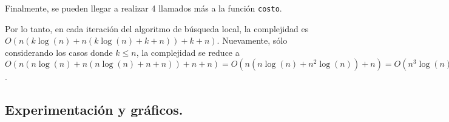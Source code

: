 Finalmente, se pueden llegar a realizar 4 llamados más a la función
\texttt{costo}.

Por lo tanto, en cada iteración del algoritmo de búsqueda local, la complejidad
es $O(n (k\log(n) + n (k\log(n) + k + n)) + k + n)$. Nuevamente, sólo
considerando los casos donde $k \le n$, la complejidad se reduce a
$O(n(n\log(n) + n (n\log(n) + n + n)) + n + n) = O(n (n\log(n) + n^2 \log(n)) + n) = O(n^3 \log(n))$.



\newpage \subsection{Experimentación y gráficos.}
